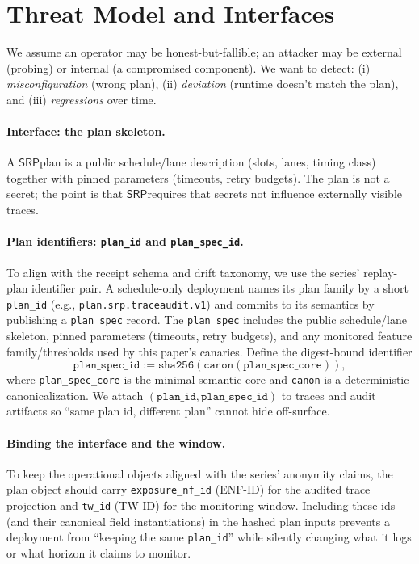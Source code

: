 \documentclass[11pt]{article}
\newcommand{\SRP}{\ensuremath{\mathsf{SRP}}}
\begin{document}
\section{Threat Model and Interfaces}
We assume an operator may be honest-but-fallible; an attacker may be external (probing) or internal (a compromised component).
We want to detect:
(i) \emph{misconfiguration} (wrong plan),
(ii) \emph{deviation} (runtime doesn't match the plan), and
(iii) \emph{regressions} over time.

\paragraph{Interface: the plan skeleton.}
A \SRP plan is a public schedule/lane description (slots, lanes, timing class) together with pinned parameters (timeouts, retry budgets).
The plan is not a secret; the point is that \SRP requires that secrets not influence externally visible traces.

\paragraph{Plan identifiers: \texttt{plan\_id} and \texttt{plan\_spec\_id}.}
To align with the receipt schema and drift taxonomy, we use the series' replay-plan identifier pair.\cite{series:receiptitems,series:planstateequiv}
A schedule-only deployment names its plan family by a short \texttt{plan\_id} (e.g., \texttt{plan.srp.traceaudit.v1}) and commits to its semantics by publishing a \texttt{plan\_spec} record.
The \texttt{plan\_spec} includes the public schedule/lane skeleton, pinned parameters (timeouts, retry budgets), and any monitored feature family/thresholds used by this paper's canaries.
Define the digest-bound identifier
\[
\texttt{plan\_spec\_id} := \texttt{sha256}(\texttt{canon}(\texttt{plan\_spec\_core})),
\]
where \texttt{plan\_spec\_core} is the minimal semantic core and \texttt{canon} is a deterministic canonicalization.\cite{series:planstateequiv}
We attach $(\texttt{plan\_id},\texttt{plan\_spec\_id})$ to traces and audit artifacts so ``same plan id, different plan'' cannot hide off-surface.

\paragraph{Binding the interface and the window.}
To keep the operational objects aligned with the series' anonymity claims, the plan object should carry
\texttt{exposure\_nf\_id} (ENF-ID) for the audited trace projection and \texttt{tw\_id} (TW-ID) for the monitoring window.
Including these ids (and their canonical field instantiations) in the hashed plan inputs prevents a deployment from ``keeping the same \texttt{plan\_id}''
while silently changing what it logs or what horizon it claims to monitor.\cite{series:traceifaces,series:threatwindows}
\end{document}

